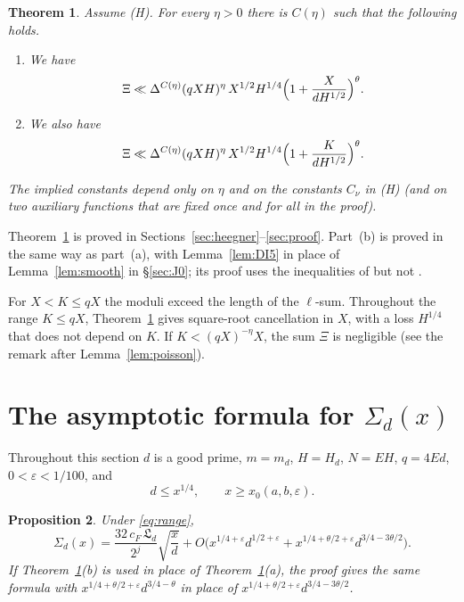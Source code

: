 \documentclass[11pt]{amsart}
\newtheorem{theorem}{Theorem}[section]
\newtheorem{proposition}[theorem]{Proposition}
\theoremstyle{remark}
\theoremstyle{definition}
\numberwithin{equation}{section}
\newcommand{\eps}{\varepsilon}
\newcommand{\Lf}{\mathfrak{L}}
\begin{document}
\begin{theorem}\label{thm:typeI}
Assume \textup{(H)}. For every $\eta>0$ there is $C(\eta)$ such that the following holds.
\begin{enumerate}
\item[(a)] We have
\[
\Xi\ll\Delta^{C(\eta)}(qXH)^{\eta}\,X^{1/2}H^{1/4}\Bigl(1+\frac{X}{dH^{1/2}}\Bigr)^{\theta}.
\]
\item[(b)] We also have
\[
\Xi\ll\Delta^{C(\eta)}(qXH)^{\eta}\,X^{1/2}H^{1/4}\Bigl(1+\frac{K}{dH^{1/2}}\Bigr)^{\theta}.
\]
\end{enumerate}
The implied constants depend only on $\eta$ and on the constants $C_\nu$ in \textup{(H)} (and on two auxiliary functions that are fixed once and for all in the proof).
\end{theorem}

Theorem~\ref{thm:typeI} is proved in Sections~\ref{sec:heegner}--\ref{sec:proof}. Part~(b) is proved in the same way as part~(a), with Lemma~\ref{lem:DI5} in place of Lemma~\ref{lem:smooth} in \S\ref{sec:J0}; its proof uses the inequalities of \cite{DI} but not \cite[Theorem~2]{Pas}.

For $X<K\le qX$ the moduli exceed the length of the $\ell$-sum. Throughout the range $K\le qX$, Theorem~\ref{thm:typeI} gives square-root cancellation in $X$, with a loss $H^{1/4}$ that does not depend on $K$. If $K<(qX)^{-\eta}X$, the sum $\Xi$ is negligible (see the remark after Lemma~\ref{lem:poisson}).

\section{\texorpdfstring{The asymptotic formula for $\Sigma_d(x)$}{The asymptotic formula for Sigma\_d(x)}}\label{sec:asymp}

Throughout this section $d$ is a good prime, $m=m_d$, $H=H_d$, $N=EH$, $q=4Ed$, $0<\eps<1/100$, and
\begin{equation}\label{eq:range}
d\le x^{1/4},\qquad x\ge x_0(a,b,\eps).
\end{equation}

\begin{proposition}\label{prop:asymp}
Under \eqref{eq:range},
\[
\Sigma_d(x)=\frac{32\,c_F\,\Lf_d}{2^j}\sqrt{\frac xd}+O\bigl(x^{1/4+\eps}d^{1/2+\eps}+x^{1/4+\theta/2+\eps}d^{3/4-3\theta/2}\bigr).
\]
If Theorem~\ref{thm:typeI}(b) is used in place of Theorem~\ref{thm:typeI}(a), the proof gives the same formula with $x^{1/4+\theta/2+\eps}d^{3/4-\theta}$ in place of $x^{1/4+\theta/2+\eps}d^{3/4-3\theta/2}$.
\end{proposition}
\end{document}
